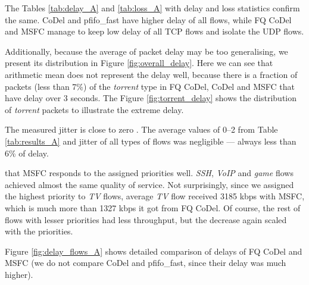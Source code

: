 The Tables \ref{tab:delay_A} and \ref{tab:loss_A} with delay and loss statistics confirm the same. CoDel and pfifo\_fast have higher delay of all flows, while FQ CoDel and MSFC manage to keep low delay of all TCP flows and isolate the UDP flows. 

Additionally, because the average of packet delay may be too generalising, we present its distribution in Figure \ref{fig:overall_delay}. Here we can see that arithmetic mean does not represent the delay well, because there is a fraction of packets (less than 7\%) of the \emph{torrent} type in FQ CoDel, CoDel and MSFC that have delay over 3 seconds. The Figure \ref{fig:torrent_delay} shows the distribution of \emph{torrent} packets to illustrate the extreme delay.

The measured jitter is close to zero . The average values of 0--2 from Table \ref{tab:results_A}  and jitter of all types of flows was negligible --- always less than 6\% of delay.  

  that MSFC responds to the assigned priorities well. \emph{SSH}, \emph{VoIP} and \emph{game} flows achieved almost the same quality of service. Not surprisingly, since we assigned the highest priority to \emph{TV} flows, average \emph{TV} flow received 3185 kbps with MSFC, which is much more than 1327 kbps it got from FQ CoDel. Of course, the rest of flows with lesser priorities had less throughput, but the decrease again scaled with the priorities.

Figure \ref{fig:delay_flows_A} shows detailed comparison of delays of FQ CoDel and MSFC (we do not compare CoDel and pfifo\_fast, since their delay was much higher). 


